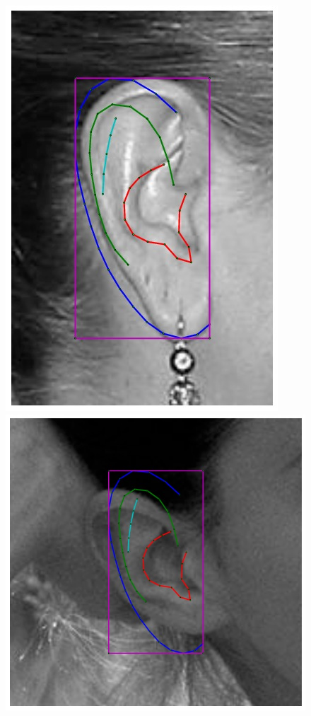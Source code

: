 \begin{figure}[!t]
    \includegraphics[height=\flowh]{resources/Ear_Deformable_Model/fittings/initial_0008}
    \includegraphics[height=\flowh]{resources/Ear_Deformable_Model/fittings/initial_0028}

\end{figure}
